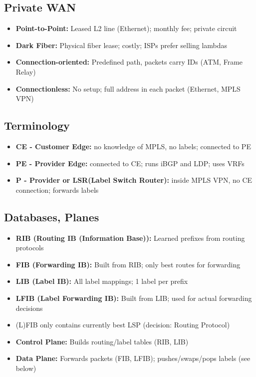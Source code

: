 \begin{multicols*}{5}
		\subsection{Private WAN}
		\begin{itemize}
			\item \textbf{Point-to-Point:} Leased L2 line (Ethernet); monthly fee; private circuit
			\item \textbf{Dark Fiber:} Physical fiber lease; costly; ISPs prefer selling lambdas
		\end{itemize}
		\begin{itemize}
			\item \textbf{Connection-oriented:} Predefined path, packets carry IDs (ATM, Frame Relay)
			\item \textbf{Connectionless:} No setup; full address in each packet (Ethernet, MPLS VPN)
		\end{itemize}
		
		\subsection{Terminology}
		\begin{itemize}
			\item \textbf{CE - Customer Edge:} no knowledge of MPLS, no labels; connected to PE
			\item \textbf{PE - Provider Edge:} connected to CE; runs iBGP and LDP; uses VRFs
			\item \textbf{P - Provider or LSR(Label Switch Router):} inside MPLS VPN, no CE connection; forwards labels
		\end{itemize}
		
		\subsection{Databases, Planes}
		\begin{itemize}
			\item \textbf{RIB (Routing IB (Information Base)):} Learned prefixes from routing protocols
			\item \textbf{FIB (Forwarding IB):} Built from RIB; only best routes for forwarding
			\item \textbf{LIB (Label IB):} All label mappings; 1 label per prefix
			\item \textbf{LFIB (Label Forwarding IB):} Built from LIB; used for actual forwarding decisions
			\item (L)FIB only contains currently best LSP (decision: Routing Protocol)
		\end{itemize}
		\begin{itemize}
			\item \textbf{Control Plane:} Builds routing/label tables (RIB, LIB)
			\item \textbf{Data Plane:} Forwards packets (FIB, LFIB); pushes/swaps/pops labels (see below)
		\end{itemize}
		

\end{multicols*}
